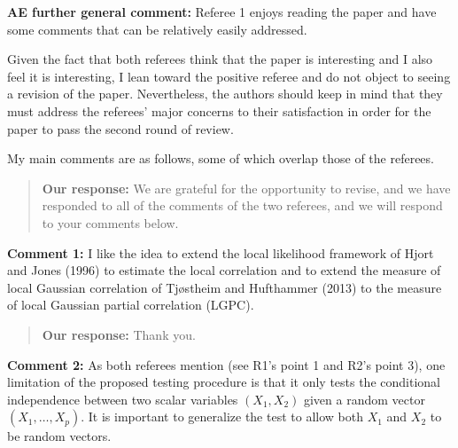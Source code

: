 \documentclass[
  12pt,
  letterpaper]{article}
\numberwithin{equation}{section}
\begin{document}
\textbf{AE further general comment:} Referee 1 enjoys reading the paper and have some comments that can be relatively easily addressed.

Given the fact that both referees think that the paper is interesting and I also feel it is interesting, I lean toward the positive referee and do not object to seeing a revision of the paper. Nevertheless, the authors should keep in mind that they must address the referees' major concerns to their satisfaction in order for the paper to pass the second round of review.

My main comments are as follows, some of which overlap those of the referees.

\begin{quote}
\textbf{Our response:} We are grateful for the opportunity to revise, and we have responded to all of the comments of the two referees, and we will respond to your comments below.
\end{quote}

\textbf{Comment 1:} I like the idea to extend the local likelihood framework of Hjort and Jones (1996) to estimate the local correlation and to extend the measure of local Gaussian correlation of Tjøstheim and Hufthammer (2013) to the measure of local Gaussian partial correlation (LGPC).

\begin{quote}
\textbf{Our response:} Thank you.
\end{quote}

\textbf{Comment 2:} As both referees mention (see R1's point 1 and R2's point 3), one limitation of the proposed testing procedure is that it only tests the conditional independence between two scalar variables \((X_1,X_2)\) given a random vector \((X_1,\ldots,X_p)\). It is important to generalize the test to allow
both \(X_1\) and \(X_2\) to be random vectors.
\end{document}
